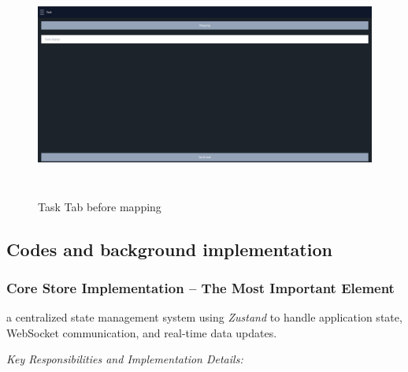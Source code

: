\documentclass[a4paper,12pt]{extreport}
\begin{document}
    \begin{figure}[h!]
    \centering
    \includegraphics[width=6.26806in,height=2.93819in]{img/image007.png}
    \caption{Task Tab before mapping}
    \label{judFig4}
    \end{figure}
    
    \subsection{Codes and background implementation}
    
    \subsubsection{Core Store Implementation -- The Most Important Element}

    a centralized state management system using \emph{Zustand} to handle
application state, WebSocket communication, and real-time data updates.

\emph{Key Responsibilities and Implementation Details:}
\end{document}

